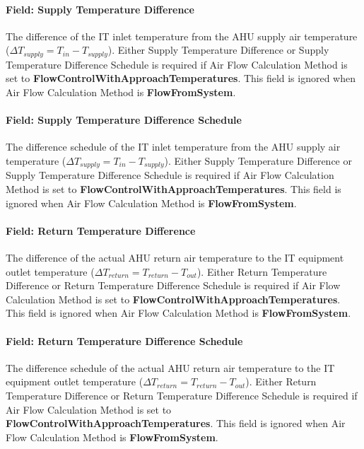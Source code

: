 \paragraph{Field: Supply Temperature Difference}\label{field-supply-temperature-difference}

The difference of the IT inlet temperature from the AHU supply air temperature ($\Delta T_{supply} = T_{in}-T_{supply}$). Either Supply Temperature Difference or Supply Temperature Difference Schedule is required if Air Flow Calculation Method is set to \textbf{FlowControlWithApproachTemperatures}. This field is ignored when Air Flow Calculation Method is \textbf{FlowFromSystem}.

\paragraph{Field: Supply Temperature Difference Schedule}\label{field-supply-temperature-difference-schedule}

The difference schedule of the IT inlet temperature from the AHU supply air temperature ($\Delta T_{supply} = T_{in}-T_{supply}$). Either Supply Temperature Difference or Supply Temperature Difference Schedule is required if Air Flow Calculation Method is set to \textbf{FlowControlWithApproachTemperatures}. This field is ignored when Air Flow Calculation Method is \textbf{FlowFromSystem}.

\paragraph{Field: Return Temperature Difference}\label{field-return-temperature-difference}

The difference of the actual AHU return air temperature to the IT equipment outlet temperature ($\Delta T_{return} = T_{return}-T_{out}$). Either Return Temperature Difference or Return Temperature Difference Schedule is required if Air Flow Calculation Method is set to \textbf{FlowControlWithApproachTemperatures}. This field is ignored when Air Flow Calculation Method is \textbf{FlowFromSystem}.

\paragraph{Field: Return Temperature Difference Schedule}\label{field-return-temperature-difference-schedule}

The difference schedule of the actual AHU return air temperature to the IT equipment outlet temperature ($\Delta T_{return} = T_{return}-T_{out}$). Either Return Temperature Difference or Return Temperature Difference Schedule is required if Air Flow Calculation Method is set to \textbf{FlowControlWithApproachTemperatures}. This field is ignored when Air Flow Calculation Method is \textbf{FlowFromSystem}.

